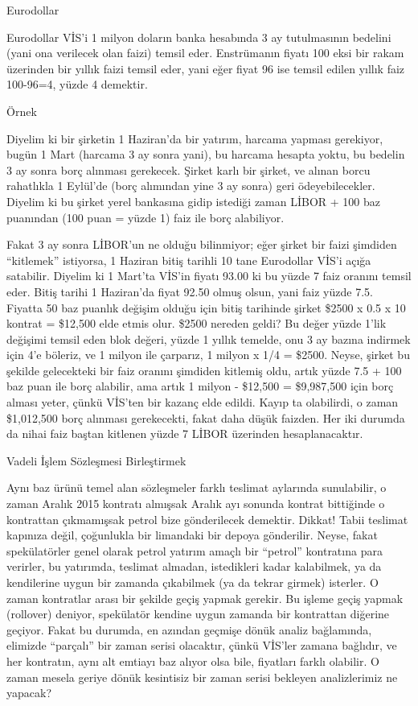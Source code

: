 \documentclass[12pt,fleqn]{article}\usepackage{../../common}
\begin{document}
Eurodollar

Eurodollar VİS'i 1 milyon doların banka hesabında 3 ay tutulmasının bedelini
(yani ona verilecek olan faizi) temsil eder. Enstrümanın fiyatı 100 eksi bir
rakam üzerinden bir yıllık faizi temsil eder, yani eğer fiyat 96 ise temsil
edilen yıllık faiz 100-96=4, yüzde 4 demektir.

Örnek

Diyelim ki bir şirketin 1 Haziran'da bir yatırım, harcama yapması gerekiyor,
bugün 1 Mart (harcama 3 ay sonra yani), bu harcama hesapta yoktu, bu bedelin 3
ay sonra borç alınması gerekecek. Şirket karlı bir şirket, ve alınan borcu
rahatlıkla 1 Eylül'de (borç alımından yine 3 ay sonra) geri
ödeyebilecekler. Diyelim ki bu şirket yerel bankasına gidip istediği zaman LİBOR
+ 100 baz puanından (100 puan = yüzde 1) faiz ile borç alabiliyor.

Fakat 3 ay sonra LİBOR'un ne olduğu bilinmiyor; eğer şirket bir faizi şimdiden
``kitlemek'' istiyorsa, 1 Haziran bitiş tarihli 10 tane Eurodollar VİS'i açığa
satabilir. Diyelim ki 1 Mart'ta VİS'in fiyatı 93.00 ki bu yüzde 7 faiz oranını
temsil eder. Bitiş tarihi 1 Haziran'da fiyat 92.50 olmuş olsun, yani faiz yüzde
7.5. Fiyatta 50 baz puanlık değişim olduğu için bitiş tarihinde şirket \$2500 x
0.5 x 10 kontrat = \$12,500 elde etmis olur. \$2500 nereden geldi? Bu değer
yüzde 1'lik değişimi temsil eden blok değeri, yüzde 1 yıllık temelde, onu 3 ay
bazına indirmek için 4'e böleriz, ve 1 milyon ile çarparız, 1 milyon x 1/4 =
\$2500. Neyse, şirket bu şekilde gelecekteki bir faiz oranını şimdiden kitlemiş
oldu, artık yüzde 7.5 + 100 baz puan ile borç alabilir, ama artık 1 milyon -
\$12,500 = \$9,987,500 için borç alması yeter, çünkü VİS'ten bir kazanç elde
edildi. Kayıp ta olabilirdi, o zaman \$1,012,500 borç alınması gerekecekti,
fakat daha düşük faizden. Her iki durumda da nihai faiz baştan kitlenen yüzde 7
LİBOR üzerinden hesaplanacaktır. 

Vadeli İşlem Sözleşmesi Birleştirmek

Aynı baz ürünü temel alan sözleşmeler farklı teslimat aylarında sunulabilir, o
zaman Aralık 2015 kontratı almışsak Aralık ayı sonunda kontrat bittiğinde o
kontrattan çıkmamışsak petrol bize gönderilecek demektir. Dikkat! Tabii
teslimat kapınıza değil, çoğunlukla bir limandaki bir depoya gönderilir. Neyse,
fakat spekülatörler genel olarak petrol yatırım amaçlı bir ``petrol''
kontratına para verirler, bu yatırımda, teslimat almadan, istedikleri kadar
kalabilmek, ya da kendilerine uygun bir zamanda çıkabilmek (ya da tekrar girmek)
isterler. O zaman kontratlar arası bir şekilde geçiş yapmak gerekir. Bu işleme
geçiş yapmak (rollover) deniyor, spekülatör kendine uygun zamanda bir
kontrattan diğerine geçiyor. Fakat bu durumda, en azından geçmişe dönük analiz
bağlamında, elimizde ``parçalı'' bir zaman serisi olacaktır, çünkü VİS'ler
zamana bağlıdır, ve her kontratın, aynı alt emtiayı baz alıyor olsa bile,
fiyatları farklı olabilir. O zaman mesela geriye dönük kesintisiz bir zaman
serisi bekleyen analizlerimiz ne yapacak?
\end{document}
